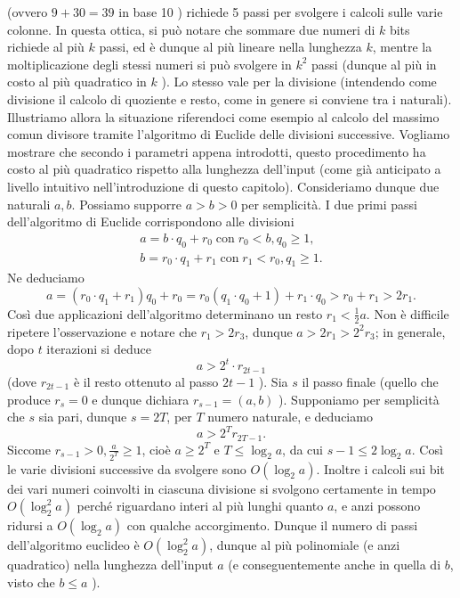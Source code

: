 (ovvero $9+30=39$ in base 10 ) richiede 5 passi per svolgere i calcoli sulle
varie colonne. In questa ottica, si può notare che sommare due numeri di $k$
bits richiede al più $k$ passi, ed è dunque al più lineare nella lunghezza $k$,
mentre la moltiplicazione degli stessi numeri si può svolgere in $k^2$ passi
(dunque al più in costo al più quadratico in $k$ ). Lo stesso vale per la
divisione (intendendo come divisione il calcolo di quoziente e resto, come in
genere si conviene tra i naturali). Illustriamo allora la situazione riferendoci
come esempio al calcolo del massimo comun divisore tramite l'algoritmo di
Euclide delle divisioni successive. Vogliamo mostrare che secondo i parametri
appena introdotti, questo procedimento ha costo al più quadratico rispetto alla
lunghezza dell'input (come già anticipato a livello intuitivo nell'introduzione
di questo capitolo). Consideriamo dunque due naturali $a, b$. Possiamo supporre
$a>b>0$ per semplicità. I due primi passi dell'algoritmo di Euclide
corrispondono alle divisioni
$$
    \begin{gathered}
        a=b \cdot q_0+r_0 \operatorname{con} r_0<b, q_0 \geq 1, \\
        b=r_0 \cdot q_1+r_1 \operatorname{con} r_1<r_0, q_1 \geq 1 .
    \end{gathered}
$$
Ne deduciamo
$$
    a=\left(r_0 \cdot q_1+r_1\right) q_0+r_0=r_0\left(q_1 \cdot q_0+1\right)+r_1 \cdot q_0>r_0+r_1>2 r_1 .
$$
Così due applicazioni dell'algoritmo determinano un resto $r_1<\frac{1}{2} a$.
Non è difficile ripetere l'osservazione e notare che $r_1>2 r_3$, dunque $a>2
    r_1>2^2 r_3$; in generale, dopo $t$ iterazioni si deduce
$$
    a>2^t \cdot r_{2 t-1}
$$
(dove $r_{2 t-1}$ è il resto ottenuto al passo $2 t-1$ ). Sia $s$ il passo
finale (quello che produce $r_s=0$ e dunque dichiara $r_{s-1}=(a, b)$ ).
Supponiamo per semplicità che $s$ sia pari, dunque $s=2 T$, per $T$ numero
naturale, e deduciamo
$$
    a>2^T r_{2 T-1} .
$$
Siccome $r_{s-1}>0, \frac{a}{2^T} \geq 1$, cioè $a \geq 2^T$ e $T \leq \log _2
    a$, da cui $s-1 \leq 2 \log _2 a$. Così le varie divisioni successive da
svolgere sono $O\left(\log _2 a\right)$. Inoltre i calcoli sui bit dei vari
numeri coinvolti in ciascuna divisione si svolgono certamente in tempo
$O\left(\log _2^2 a\right)$ perché riguardano interi al più lunghi quanto $a$, e
anzi possono ridursi a $O\left(\log _2 a\right)$ con qualche accorgimento.
Dunque il numero di passi dell'algoritmo euclideo è $O\left(\log _2^2 a\right)$,
dunque al più polinomiale (e anzi quadratico) nella lunghezza dell'input $a$ (e
conseguentemente anche in quella di $b$, visto che $b \leq a$ ).
